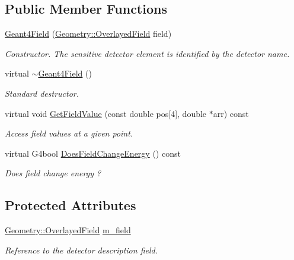 \subsection*{Public Member Functions}
\begin{DoxyCompactItemize}
\item 
\hyperlink{class_d_d4hep_1_1_simulation_1_1_geant4_field_addb058e48762664448c2c1fdce1cc807}{Geant4\+Field} (\hyperlink{class_d_d4hep_1_1_geometry_1_1_overlayed_field}{Geometry\+::\+Overlayed\+Field} field)
\begin{DoxyCompactList}\small\item\em Constructor. The sensitive detector element is identified by the detector name. \end{DoxyCompactList}\item 
virtual \hyperlink{class_d_d4hep_1_1_simulation_1_1_geant4_field_ac653a1246053747ac97c18dee3c8d9c2}{$\sim$\+Geant4\+Field} ()
\begin{DoxyCompactList}\small\item\em Standard destructor. \end{DoxyCompactList}\item 
virtual void \hyperlink{class_d_d4hep_1_1_simulation_1_1_geant4_field_ab1c27bc8b1ee450441ee30f52dd27cff}{Get\+Field\+Value} (const double pos\mbox{[}4\mbox{]}, double $\ast$arr) const
\begin{DoxyCompactList}\small\item\em Access field values at a given point. \end{DoxyCompactList}\item 
virtual G4bool \hyperlink{class_d_d4hep_1_1_simulation_1_1_geant4_field_ae2f1ef05f6a4d0d2d323a89d34bb1000}{Does\+Field\+Change\+Energy} () const
\begin{DoxyCompactList}\small\item\em Does field change energy ? \end{DoxyCompactList}\end{DoxyCompactItemize}
\subsection*{Protected Attributes}
\begin{DoxyCompactItemize}
\item 
\hyperlink{class_d_d4hep_1_1_geometry_1_1_overlayed_field}{Geometry\+::\+Overlayed\+Field} \hyperlink{class_d_d4hep_1_1_simulation_1_1_geant4_field_a453c3e707d5f019ef541b449c80100ae}{m\+\_\+field}
\begin{DoxyCompactList}\small\item\em Reference to the detector description field. \end{DoxyCompactList}\end{DoxyCompactItemize}


